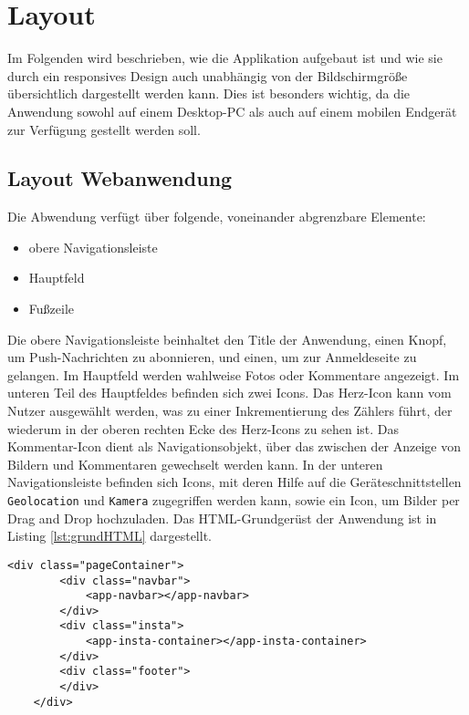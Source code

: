 \chapter{Layout}

Im Folgenden wird beschrieben, wie die Applikation aufgebaut ist und wie sie durch ein responsives Design auch unabhängig von der Bildschirmgröße übersichtlich dargestellt werden kann. Dies ist besonders wichtig, da die Anwendung sowohl auf einem Desktop-PC als auch auf einem mobilen Endgerät zur Verfügung gestellt werden soll. 

\section{Layout Webanwendung}
Die Abwendung verfügt über folgende, voneinander abgrenzbare Elemente: 
\begin{itemize}
    \item obere Navigationsleiste
    \item Hauptfeld
    \item Fußzeile
\end{itemize}

Die obere Navigationsleiste beinhaltet den Title der Anwendung, einen Knopf, um Push-Nachrichten zu abonnieren, und einen, um zur Anmeldeseite zu gelangen. Im Hauptfeld werden wahlweise Fotos oder Kommentare angezeigt. Im unteren Teil des Hauptfeldes befinden sich zwei Icons. Das Herz-Icon kann vom Nutzer ausgewählt werden, was zu einer Inkrementierung des Zählers führt, der wiederum in der oberen rechten Ecke des Herz-Icons zu sehen ist. Das Kommentar-Icon dient als Navigationsobjekt, über das zwischen der Anzeige von Bildern und Kommentaren gewechselt werden kann. In der unteren Navigationsleiste befinden sich Icons, mit deren Hilfe auf die Geräteschnittstellen \texttt{Geolocation} und \texttt{Kamera} zugegriffen werden kann, sowie ein Icon, um Bilder per Drag and Drop hochzuladen.  Das HTML-Grundgerüst der Anwendung ist in Listing \ref{lst:grundHTML} dargestellt. 

\begin{lstlisting}[caption={HTML-Grundgerüst der Webanwendung}, label=lst:grundHTML, float=!htb]
    <div class="pageContainer">
        <div class="navbar">
            <app-navbar></app-navbar>
        </div>
        <div class="insta">
            <app-insta-container></app-insta-container>
        </div>
        <div class="footer">
        </div>
    </div>
\end{lstlisting}

